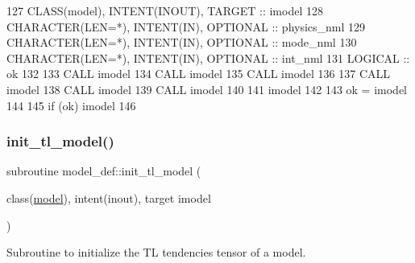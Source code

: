 \begin{DoxyCode}
127     \textcolor{keywordtype}{CLASS}(model), \textcolor{keywordtype}{INTENT(INOUT)}, \textcolor{keywordtype}{TARGET} :: imodel
128     \textcolor{keywordtype}{CHARACTER(LEN=*)}, \textcolor{keywordtype}{INTENT(IN)}, \textcolor{keywordtype}{OPTIONAL} :: physics\_nml
129     \textcolor{keywordtype}{CHARACTER(LEN=*)}, \textcolor{keywordtype}{INTENT(IN)}, \textcolor{keywordtype}{OPTIONAL} :: mode\_nml
130     \textcolor{keywordtype}{CHARACTER(LEN=*)}, \textcolor{keywordtype}{INTENT(IN)}, \textcolor{keywordtype}{OPTIONAL} :: int\_nml
131     \textcolor{keywordtype}{LOGICAL} :: ok
132 
133     \textcolor{keyword}{CALL }imodel%
134     \textcolor{keyword}{CALL }imodel%
135     \textcolor{keyword}{CALL }imodel%
136 
137     \textcolor{keyword}{CALL }imodel%
138     \textcolor{keyword}{CALL }imodel%
139     \textcolor{keyword}{CALL }imodel%
140 
141     imodel%
142 
143     ok = imodel%
144 
145     \textcolor{keywordflow}{if} (ok) imodel%
146 
\end{DoxyCode}
\mbox{\label{namespacemodel__def_a70a2babf6e9897311a4177e864cc5a9e}} 
\subsubsection{\texorpdfstring{init\+\_\+tl\+\_\+model()}{init\_tl\_model()}}
{\footnotesize\ttfamily subroutine model\+\_\+def\+::init\+\_\+tl\+\_\+model (\begin{DoxyParamCaption}\item[{class(\hyperlink{structmodel__def_1_1model}{model}), intent(inout), target}]{imodel }\end{DoxyParamCaption})\hspace{0.3cm}{\ttfamily [private]}}



Subroutine to initialize the TL tendencies tensor of a model. 


